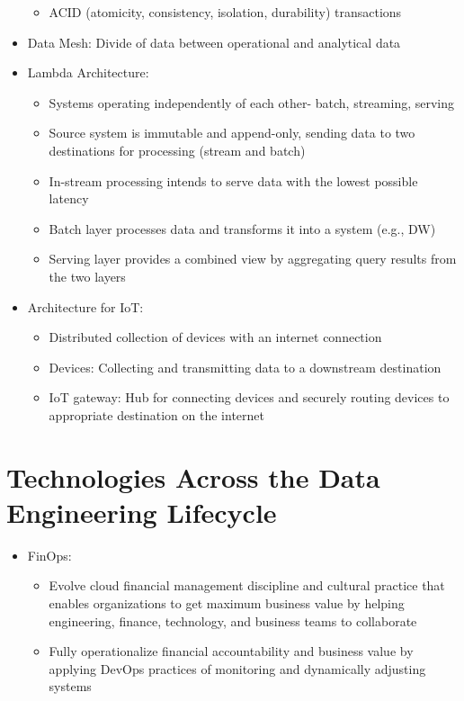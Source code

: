 \documentclass[11pt]{scrartcl}
\begin{document}
\begin{itemize}
\begin{itemize}
		\item ACID (atomicity, consistency, isolation, durability) transactions
	\end{itemize}
	\item Data Mesh: Divide of data between operational and analytical data
	\item Lambda Architecture:
	\begin{itemize}
		\item Systems operating independently of each other- batch, streaming, serving
		\item Source system is immutable and append-only, sending data to two destinations for processing (stream and batch)
		\item In-stream processing intends to serve data with the lowest possible latency
		\item Batch layer processes data and transforms it into a system (e.g., DW)
		\item Serving layer provides a combined view by aggregating query results from the two layers
	\end{itemize}
	\item Architecture for IoT:
	\begin{itemize}
		\item Distributed collection of devices with an internet connection
		\item Devices: Collecting and transmitting data to a downstream destination
		\item IoT gateway: Hub for connecting devices and securely routing devices to appropriate destination on the internet
	\end{itemize}
\end{itemize}




\section*{Technologies Across the Data Engineering Lifecycle}
\begin{itemize}
	\item FinOps:
	\begin{itemize}
		\item Evolve cloud financial management discipline and cultural practice that enables organizations to get maximum business value by helping engineering, finance, technology, and business teams to collaborate
		\item Fully operationalize financial accountability and business value by applying DevOps practices of monitoring and dynamically adjusting systems
	\end{itemize}
\end{itemize}
\end{document}
